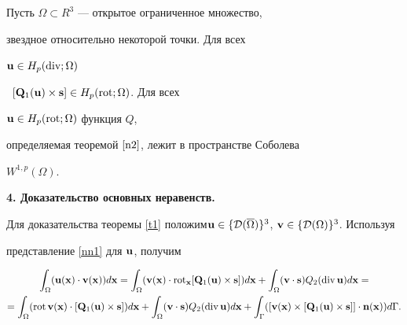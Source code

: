 \begin{lems}


Пусть $\Omega\subset R^3 $ --- открытое ограниченное множество,


звездное относительно некоторой точки. Для всех


${\bold{u}\in H_p(\operatorname{div};\Omega)}$


\ $[\bold{Q}_1(\bold{u})\times\bold{s}]\in H_p(\operatorname{rot};\Omega)$. Для всех


$\bold{u}\in H_p(\operatorname{rot};\Omega)$ функция $Q$,


определяемая теоремой $\ref{n2}$, лежит в пространстве Соболева


$W^{1,p}(\Omega)$.


\end{lems}


\addtocounter{section}{1}


\setcounter{equation}{0}


\setcounter{thms}{0}





{\bf 4. Доказательство основных неравенств.}


Для доказательства теоремы \ref{t1} положим\linebreak $\bold{u}\in\{{\cal


D}(\overline{\Omega})\}^3$, $\bold{v}\in\{{\cal D}(\Omega)\}^3$. Используя


представление \ref{nn1} для $\bold{u}$, получим


\begin{gather*}


\int_{\Omega}(\bold{u}(\bold{x})\cdot\bold{v}(\bold{x}))d\bold{x}=


\int_{\Omega}(\bold{v}(\bold{x})\cdot\Rot_{\bold{x}}[\bold{Q}_1


(\bold{u})\times\bold{s}])d\bold{x}+\int_{\Omega}(\bold{v}\cdot\bold{s})


Q_2(\Div\bold{u})d\bold{x}= \\


%


=\int_{\Omega}(\Rot\bold{v}(\bold{x})\cdot[\bold{Q}_1


(\bold{u})\times\bold{s}])d\bold{x}+\int_{\Omega}(\bold{v}\cdot\bold{s})


Q_2(\Div\bold{u})d\bold{x}+\int_{\Gamma}([\bold{v}(\bold{x})\times


[\bold{Q}_1(\bold{u})\times\bold{s}]]\cdot\bold{n}(\bold{x}))d\Gamma.


\end{gather*}



